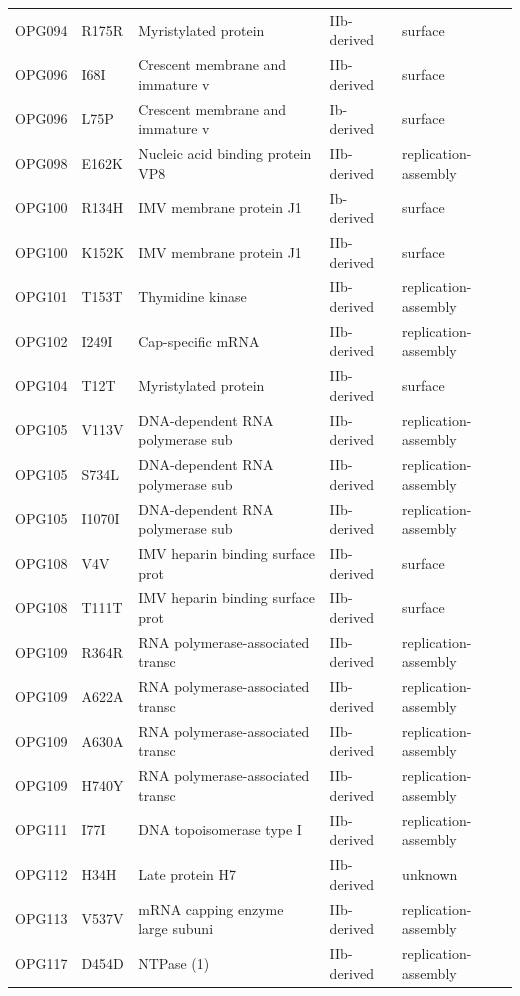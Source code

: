 \documentclass[11pt]{article}
\begin{document}
\begin{longtable}{lllll}
OPG094 & R175R & Myristylated protein & IIb-derived & surface \\
OPG096 & I68I & Crescent membrane and immature v & IIb-derived & surface \\
OPG096 & L75P & Crescent membrane and immature v & Ib-derived & surface \\
OPG098 & E162K & Nucleic acid binding protein VP8 & IIb-derived & replication-assembly \\
OPG100 & R134H & IMV membrane protein J1 & Ib-derived & surface \\
OPG100 & K152K & IMV membrane protein J1 & IIb-derived & surface \\
OPG101 & T153T & Thymidine kinase & IIb-derived & replication-assembly \\
OPG102 & I249I & Cap-specific mRNA & IIb-derived & replication-assembly \\
OPG104 & T12T & Myristylated protein & IIb-derived & surface \\
OPG105 & V113V & DNA-dependent RNA polymerase sub & IIb-derived & replication-assembly \\
OPG105 & S734L & DNA-dependent RNA polymerase sub & IIb-derived & replication-assembly \\
OPG105 & I1070I & DNA-dependent RNA polymerase sub & IIb-derived & replication-assembly \\
OPG108 & V4V & IMV heparin binding surface prot & IIb-derived & surface \\
OPG108 & T111T & IMV heparin binding surface prot & IIb-derived & surface \\
OPG109 & R364R & RNA polymerase-associated transc & IIb-derived & replication-assembly \\
OPG109 & A622A & RNA polymerase-associated transc & IIb-derived & replication-assembly \\
OPG109 & A630A & RNA polymerase-associated transc & IIb-derived & replication-assembly \\
OPG109 & H740Y & RNA polymerase-associated transc & IIb-derived & replication-assembly \\
OPG111 & I77I & DNA topoisomerase type I & IIb-derived & replication-assembly \\
OPG112 & H34H & Late protein H7 & IIb-derived & unknown \\
OPG113 & V537V & mRNA capping enzyme large subuni & IIb-derived & replication-assembly \\
OPG117 & D454D & NTPase (1) & IIb-derived & replication-assembly \\

\end{longtable}
\end{document}
